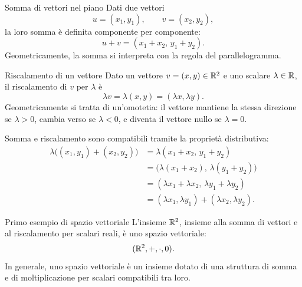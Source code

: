 \documentclass[a4paper]{article}
\begin{document}
\begin{snippetdefinition}{Somma di vettori nel piano}
    Dati due vettori
    \[
        u=(x_1,y_1),
        \qquad
        v=(x_2,y_2),
    \]
    la loro somma è definita componente per componente:
    \[
        u+v = (x_1+x_2,\, y_1+y_2).
    \]
    Geometricamente, la somma si interpreta con la regola del parallelogramma.
\end{snippetdefinition}

\begin{center}
\end{center}

\begin{snippetdefinition}{Riscalamento di un vettore}
    Dato un vettore \(v=(x,y)\in\mathbb{R}^2\) e uno scalare \(\lambda\in\mathbb{R}\), il riscalamento di \(v\) per \(\lambda\) è
    \[
        \lambda v = \lambda(x,y) = (\lambda x,\lambda y).
    \]
    Geometricamente si tratta di un'omotetia: il vettore mantiene la stessa direzione se \(\lambda>0\), cambia verso se \(\lambda<0\), e diventa il vettore nullo se \(\lambda=0\).
\end{snippetdefinition}

Somma e riscalamento sono compatibili tramite la proprietà distributiva:
\begin{align*}
    \lambda\bigl((x_1,y_1)+(x_2,y_2)\bigr)
    &= \lambda(x_1+x_2,\, y_1+y_2) \\
    &= \bigl(\lambda(x_1+x_2),\, \lambda(y_1+y_2)\bigr) \\
    &= (\lambda x_1+\lambda x_2,\, \lambda y_1+\lambda y_2) \\
    &= (\lambda x_1,\lambda y_1)+(\lambda x_2,\lambda y_2).
\end{align*}

\begin{snippetdefinition}{Primo esempio di spazio vettoriale}
    L'insieme \(\mathbb{R}^2\), insieme alla somma di vettori e al riscalamento per scalari reali, è uno spazio vettoriale:
    \[
        (\mathbb{R}^2,+,\cdot,0).
    \]
    In generale, uno spazio vettoriale è un insieme dotato di una struttura di somma e di moltiplicazione per scalari compatibili tra loro.
\end{snippetdefinition}
\end{document}
